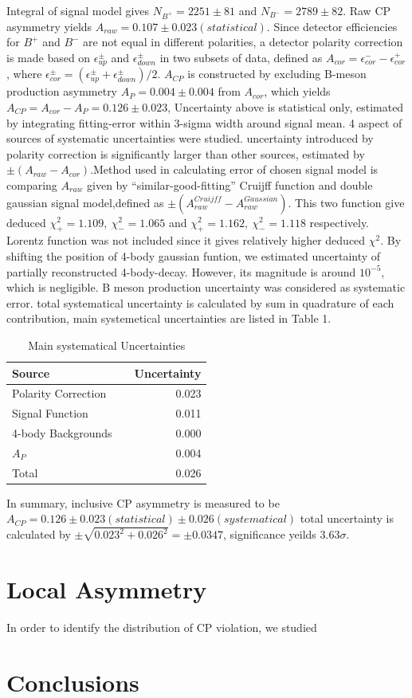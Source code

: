 \documentclass[12pt, twoside, notitlepage, twocolumn]{article}
\begin{document}
        Integral of signal model gives $N_{B^+} = 2251 \pm 81$ and $N_{B^-} = 2789 \pm 82$. Raw CP asymmetry yields $A_{raw}=0.107 
        \pm 0.023 (statistical)$. Since detector efficiencies for $B^+$ and $B^-$ are not equal in different polarities, a detector 
        polarity correction is made based on $\epsilon^\pm_{up}$ and $\epsilon^\pm_{down}$ in two subsets of data, defined as 
        $A_{cor}=\epsilon_{cor}^--\epsilon_{cor}^+$, where $\epsilon_{cor}^\pm = (\epsilon^\pm_{up}+\epsilon^\pm_{down})/2$.
        $A_{CP}$ is constructed by excluding B-meson production asymmetry $A_P = 0.004\pm0.004$\cite{1310.4740} from $A_{cor}$, which 
        yields $A_{CP} = A_{cor} - A_P = 0.126 \pm 0.023$, Uncertainty above is statistical only, estimated by integrating 
        fitting-error within 3-sigma width around signal mean. 4 aspect of sources of systematic uncertainties were studied. uncertainty 
        introduced by polarity correction is significantly larger than other sources, estimated by $\pm(A_{raw}-A_{cor})$.Method used in 
        calculating error of chosen signal model is comparing $A_{raw}$ given by ``similar-good-fitting'' Cruijff function and double 
        gaussian signal model,defined as $\pm(A_{raw}^{Cruijff}-A_{raw}^{Gaussian})$. This two function give deduced $\chi^2_+=1.109,\ 
        \chi^2_-=1.065$ and $\chi^2_+=1.162,\ \chi^2_-=1.118$ respectively. Lorentz function was not included since it gives relatively 
        higher deduced $\chi^2$. By shifting the position of 4-body gaussian funtion, we estimated uncertainty of partially reconstructed 
        4-body-decay. However, its magnitude is around $10^{-5}$, which is negligible. B meson production uncertainty was considered as 
        systematic error. total systematical uncertainty is calculated by sum in quadrature of each contribution, main systemetical 
        uncertainties are listed in Table 1.
        \begin{table}[ht]
            \centering
            \caption{Main systematical Uncertainties}
            \begin{tabularx}{9.73cm}{lXr}
            \hline
            Source & & Uncertainty \\
            \hline
            Polarity Correction  & & 0.023 \\
            Signal Function  & & 0.011 \\
            4-body Backgrounds & & 0.000 \\
            $A_P$ & & 0.004 \\
            \hline
            Total & & 0.026 \\
            \hline
            \end{tabularx}
        \end{table}
        \newline In summary, inclusive CP asymmetry is measured to be $A_{CP} = 0.126\pm0.023(statistical)\pm0.026(systematical)$
        total uncertainty is calculated by $\pm \sqrt{0.023^2+0.026^2}=\pm 0.0347$, significance yeilds $3.63\sigma$.
        \section{Local Asymmetry}
        In order to identify the distribution of CP violation, we studied 
        \section{Conclusions}
        
        
    
\end{document}
